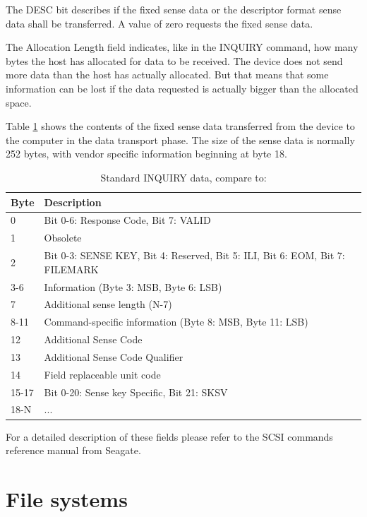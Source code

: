 \newpage

The DESC bit describes if the fixed sense data or the descriptor format sense data shall be transferred. A value of zero requests the fixed sense data\cite{scsi_seagate}.

The Allocation Length field indicates, like in the INQUIRY command, how many bytes the host has allocated for data to be received. The device does not send more data than the host has actually allocated. But that means that some information can be lost if the data requested is actually bigger than the allocated space.

Table \ref{table:sense_data} shows the contents of the fixed sense data transferred from the device to the computer in the data transport phase. The size of the sense data is normally 252 bytes, with vendor specific information beginning at byte 18.

\begin{table}[ht]
\caption{Standard INQUIRY data, compare to: \cite{usb_ms_jan, scsi_seagate}}
\centering
\begin{tabular}{|l|l|}
\hline\hline
\textbf{Byte} & \textbf{Description}\\ \hline
0 & Bit 0-6: Response Code, Bit 7: VALID \\ \hline
1 & Obsolete \\ \hline
2 & Bit 0-3: SENSE KEY, Bit 4: Reserved, Bit 5: ILI, Bit 6: EOM, Bit 7:  FILEMARK \\ \hline
3-6 & Information (Byte 3: MSB, Byte 6: LSB) \\ \hline
7 & Additional sense length (N-7) \\ \hline
8-11 & Command-specific information (Byte 8: MSB, Byte 11: LSB) \\ \hline
12 & Additional Sense Code \\ \hline
13 & Additional Sense Code Qualifier \\ \hline
14 & Field replaceable unit code \\ \hline
15-17 & Bit 0-20: Sense key Specific, Bit 21: SKSV \\ \hline
18-N & ... \\ \hline
\end{tabular}
\label{table:sense_data}
\end{table}

For a detailed description of these fields please refer to the SCSI commands reference manual from Seagate\cite{scsi_seagate}.

\chapter{File systems}

